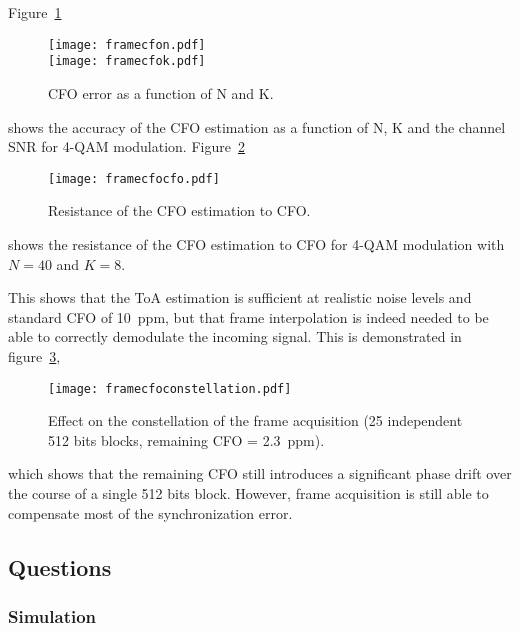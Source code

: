 Figure~\ref{fig:framecfo}
\begin{figure}
  \centering
  \texttt{[image: framecfon.pdf]}
  \\\texttt{[image: framecfok.pdf]}
  \caption{CFO error as a function of N and K.\label{fig:framecfo}}
\end{figure}
shows the accuracy of the CFO estimation as a function of N, K and the channel SNR for 4-QAM modulation.
Figure~\ref{fig:framecfocfo}
\begin{figure}
  \centering
  \texttt{[image: framecfocfo.pdf]}
  \caption{Resistance of the CFO estimation to CFO.\label{fig:framecfocfo}}
\end{figure}
shows the resistance of the CFO estimation to CFO for 4-QAM modulation with $N = 40$ and $K=8$.

This shows that the ToA estimation is sufficient at realistic noise levels and standard CFO of \SI{10}{ppm}, but that frame interpolation is indeed needed to be able to correctly demodulate the incoming signal.
This is demonstrated in figure~\ref{fig:framecfoconst},
\begin{figure}
  \centering
  \texttt{[image: framecfoconstellation.pdf]}
  \caption[Effect on the constellation of the frame acquisition]{Effect on the constellation of the frame acquisition (25 independent 512 bits blocks, remaining CFO = \SI{2.3}{ppm}).\label{fig:framecfoconst}}
\end{figure}
which shows that the remaining CFO still introduces a significant phase drift over the course of a single 512 bits block. However, frame acquisition is still able to compensate most of the synchronization error.


\subsection{Questions}
\subsubsection{Simulation}

